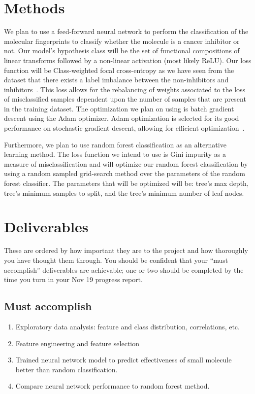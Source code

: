 \documentclass{article}
\begin{document}
\newpage

\section{Methods}
We plan to use a feed-forward neural network to perform the classification of the molecular fingerprints to classify whether the molecule is a cancer inhibitor or not. Our model’s hypothesis class will be the set of functional compositions of linear transforms followed by a non-linear activation (most likely ReLU). Our loss function will be Class-weighted focal cross-entropy as we have seen from the dataset that there exists a label imbalance between the non-inhibitors and inhibitors~\cite{cui2019classbalanced}. This loss allows for the rebalancing of weights associated to the loss of misclassified samples dependent upon the number of samples that are present in the training dataset. The optimization we plan on using is batch gradient descent using the Adam optimizer. Adam optimization is selected for its good performance on stochastic gradient descent, allowing for efficient optimization~\cite{kingma2017adam}.

Furthermore, we plan to use random forest classification as an alternative learning method. The loss function we intend to use is Gini impurity as a measure of misclassification and will optimize our random forest classification by using a random sampled grid-search method over the parameters of the random forest classifier. The parameters that will be optimized will be: tree’s max depth, tree’s minimum samples to split, and the tree’s minimum number of leaf nodes. 



\section{Deliverables}
These are ordered by how important they are to the project and how thoroughly you have thought them through. You should be confident that your ``must accomplish'' deliverables are achievable; one or two should be completed by the time you turn in your Nov 19 progress report.

\subsection{Must accomplish}

\begin{enumerate}
\item Exploratory data analysis: feature and class distribution, correlations, etc.
\item Feature engineering and feature selection
\item Trained neural network model to predict effectiveness of small molecule better than random classification.
\item Compare neural network performance to random forest method.

\end{enumerate}
\end{document}
